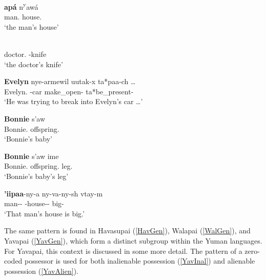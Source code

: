 \begin{exe}\ex\label{CocGen}
\gll \textbf{ap\'a} n\textsuperscript{y}aw\'a\\
     man.\acc{} house.\acc{}\\
\glt `the man's house'
\end{exe}


\begin{exe}\ex\label{DieGen}
\gll \textbf{}  \\
doctor.\acc{} \poss{}-knife\\
\glt `the doctor's knife'
\end{exe}


\begin{exe}\ex\label{JamGen}
\gll \textbf{Evelyn} nye-armewil uutak-x ta*paa-ch \dots\\
Evelyn.\acc{} \ali{}-car make\_open-\irr{} ta*be\_present-\ssbj{}\\
\glt `He was trying to break into Evelyn's car \dots'
\end{exe} 

\begin{exe}\ex\label{MarGen}
\begin{xlist} 
\ex\gll \textbf{Bonnie} s'aw\\
Bonnie.\acc{} offspring.\acc{}\\
\glt `Bonnie's baby'

\ex\gll \textbf{Bonnie} s'aw ime\\
Bonnie.\acc{} offspring.\acc{} leg.\acc{}\\
\glt `Bonnie's baby's leg'

\ex\gll \textbf{'iipaa}-ny-a ny-va-ny-sh vtay-m\\
man-\dem{}-\augv{} \poss{}-house-\dem{}-\nom{} big-\rls{}\\
\glt `That man's house is big.'
\end{xlist}
\end{exe}

The same pattern is found in Havasupai (\ref{HavGen}), Walapai (\ref{WalGen}), and Yavapai (\ref{YavGen}), which form a distinct subgroup within the Yuman languages. 
For Yavapai, this context is discussed in some more detail. 
The pattern of a zero-coded possessor is used for both inalienable possession (\ref{YavInal}) and alienable possession (\ref{YavAlien}).
 
